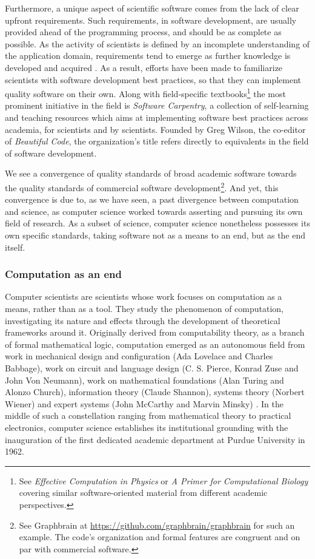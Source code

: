 Furthermore, a unique aspect of scientific software comes from the lack of clear upfront requirements. Such requirements, in software development, are usually provided ahead of the programming process, and should be as complete as possible. As the activity of scientists is defined by an incomplete understanding of the application domain, requirements tend to emerge as further knowledge is developed and acquired \citep{segal_when_2005}. As a result, efforts have been made to familiarize scientists with software development best practices, so that they can implement quality software on their own. Along with field-specific textbooks\footnote{See \emph{Effective Computation in Physics} \citep{scopatz_effective_2015} or \emph{A Primer for Computational Biology} \citep{oneil_primer_2019} covering similar software-oriented material from different academic perspectives.} the most prominent initiative in the field is \emph{Software Carpentry}, a collection of self-learning and teaching resources which aims at implementing software best practices across academia, for scientists and by scientists. Founded by Greg Wilson, the co-editor of \emph{Beautiful Code}, the organization's title refers directly to equivalents in the field of software development.

We see a convergence of quality standards of broad academic software towards the quality standards of commercial software development\footnote{See Graphbrain at \url{https://github.com/graphbrain/graphbrain} for such an example. The code's organization and formal features are congruent and on par with commercial software.}.  And yet, this convergence is due to, as we have seen, a past divergence between computation and science, as computer science worked towards asserting and pursuing its own field of research. As a subset of science, computer science nonetheless possesses its own specific standards, taking software not as a means to an end, but as the end itself.

\subsubsection{Computation as an end}
\label{subsubsec:computation-end}

Computer scientists are scientists whose work focuses on computation as a means, rather than as a tool. They study the phenomenon of computation, investigating its nature and effects through the development of theoretical frameworks around it. Originally derived from computability theory, as a branch of formal mathematical logic, computation emerged as an autonomous field from work in mechanical design and configuration (Ada Lovelace and Charles Babbage),  work on circuit and language design (C. S. Pierce, Konrad Zuse and John Von Neumann), work on mathematical foundations (Alan Turing and Alonzo Church), information theory (Claude Shannon), systems theory (Norbert Wiener) and expert systems (John McCarthy and Marvin Minsky) \citep{ifrah_universal_2001}. In the middle of such a constellation ranging from mathematical theory to practical electronics, computer science establishes its institutional grounding with the inauguration of the first dedicated academic department at Purdue University in 1962.

